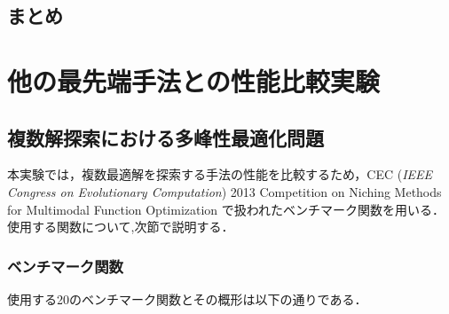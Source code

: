 \documentclass[a4j,11pt]{jarticle}
\begin{document}
\subsection{まとめ}

\FloatBarrier
\newpage
\section{他の最先端手法との性能比較実験}
\label{sec:experiment}


\subsection{複数解探索における多峰性最適化問題}
\label{ss:cec2013}
本実験では，複数最適解を探索する手法の性能を比較するため，CEC ({\it IEEE Congress on Evolutionary Computation}) 2013 Competition on Niching Methods for Multimodal Function Optimization \cite{CEC2013} で扱われたベンチマーク関数を用いる．使用する関数について,次節で説明する．

\subsubsection{ベンチマーク関数}
\label{sss:benchmark}
使用する20のベンチマーク関数とその概形は以下の通りである．
\end{document}
